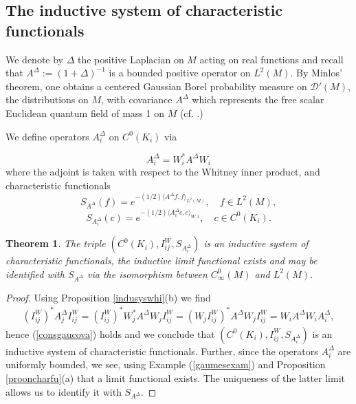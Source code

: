 \documentclass[11pt,reqno]{amsart}
\numberwithin{equation}{section}
\newtheorem{theorem}{Theorem}[section]
\theoremstyle{remark}
\theoremstyle{rmdefinition}
\begin{document}
\subsection{The inductive system of characteristic functionals}
We denote by $\Delta$ the positive Laplacian on $M$ acting on real functions and recall that $A^{\Delta}:=(1+\Delta)^{-1}$ is a bounded positive operator on
$L^2(M)$. By Minlos' theorem, one obtains a centered Gaussian Borel probability measure on $\mathcal{D}'(M)$, the distributions on $M$, with covariance $A^{\Delta}$ which represents the free scalar Euclidean quantum field of mass 1 on $M$ (cf. \cite[Chapter 6]{GJ}.) 

We define operators $A_i^{\Delta}$ on $C^0(K_{i})$ via

\begin{equation}\label{aioperdefj}
A_i^{\Delta}=W_i^{*}A^{\Delta}W_i
\end{equation}
where the adjoint is taken with respect to the Whitney inner product, and characteristic functionals
\begin{equation}\label{charfuncont}
S_{A^{\Delta}}(f)=e^{-(1/2)\langle A^{\Delta} f, f\rangle_{L^2(M)}}   ,\quad  f \in L^2(M),
\end{equation}
\begin{equation}\label{charfundiscr}
 S_{A^{\Delta}_{i}}(c)=e^{-(1/2)\langle A^{\Delta}_{i}c, c\rangle_{W,i}}  ,\quad  c\in C^0(K_{i}).
\end{equation}
\begin{theorem}\label{theoremonman}
The triple $( C^0(K_{i}), I_{ij}^{W}, S_{A^{\Delta}_{i}})$ is an inductive system of characteristic functionals, the inductive limit functional exists and may be identified with $S_{A^{\Delta}}$ via the isomorphism between $C^0_{\infty}(M)$ and $L^2(M)$.
\end{theorem}
\begin{proof}
Using Proposition \ref{indusyswhi}(b) we find
\begin{multline*}
(I_{ij}^{W})^{*}A_j^{\Delta} I_{ij}^{W} = (I_{ij}^{W})^{*}W_j^{*}A^{\Delta}W_j I_{ij}^{W}=
(W_jI_{ij}^{W})^{*}A^{\Delta}W_j I_{ij}^{W}  = W_iA^{\Delta}W_i A_i^{\Delta},
\end{multline*}
hence (\ref{consgaucova}) holds and we conclude that $( C^0(K_{i}), I_{ij}^{W}, S_{A^{\Delta}_{i}})$ is an  inductive system of characteristic functionals. Further, since the operators $A_i^{\Delta}$ are uniformly bounded, we see, using  Example (\ref{gaumesexam}) and Proposition \ref{prooncharfu}(a)  that a limit functional exists. The uniqueness of the latter limit allows us to identify it with $S_{A^{\Delta}}$. 
\end{proof}
\end{document}
